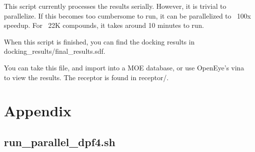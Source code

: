 This script currently processes the results serially. However, it is trivial to parallelize. If this becomes too cumbersome to run, it can be parallelized to ~100x speedup. For ~22K compounds, it takes around 10 minutes to run. 

When this script is finished, you can find the docking results in docking\_results/final\_results.sdf. 

You can take this file, and import into a MOE database, or use OpenEye's vina to view the results. The receptor is found in receptor/. 




\newpage


\section{Appendix}



\subsection{run\_parallel\_dpf4.sh}



